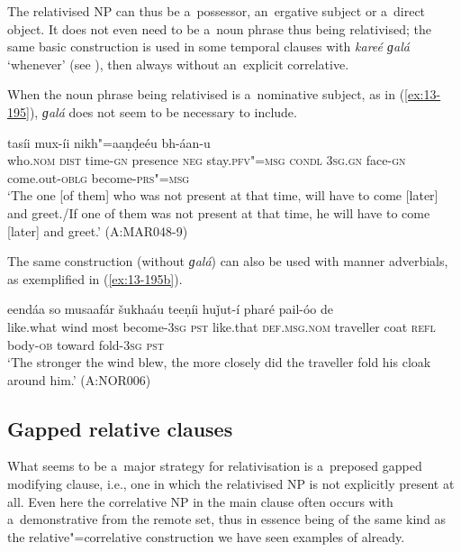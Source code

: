 

The relativised NP can thus be a~possessor, an~ergative subject or a~direct object. It does not even need to be a~noun phrase thus being relativised; the same basic construction is used in some temporal clauses with \textit{kareé ɡalá} `whenever' (see ), then always without an~explicit correlative.


When the noun phrase being relativised is a~nominative subject, as in (\ref{ex:13-195}), \textit{ɡalá} does not seem to be necessary to include. 

\begin{exe}
\ex
\label{ex:13-195}
 tasíi mux-íi nikh"=aaṇḍeéu bh-áan-u \\
who.\textsc{nom} \textsc{dist} time-\textsc{gn} presence \textsc{neg} stay.\textsc{pfv"=msg}  \textsc{condl } \textsc{3sg.gn} face-\textsc{gn} come.out-\textsc{oblg} become-\textsc{prs"=msg} \\
\glt `The one [of them] who was not present at that time, will have to come [later] and greet./If one of them was not present at that time, he will have to come [later] and greet.' (A:MAR048-9)
\end{exe}

The same construction (without \textit{ɡalá}) can also be used with manner adverbials, as exemplified in (\ref{ex:13-195b}).

\begin{exe}
\ex
\label{ex:13-195b}
 eendáa so musaafár šukhaáu teeṇíi huǰut-í pharé pail-óo de\\
like.what wind most become-\textsc{3sg} \textsc{pst} like.that \textsc{def.msg.nom} traveller coat \textsc{refl} body-\textsc{ob} toward fold-\textsc{3sg} \textsc{pst} \\
\glt `The stronger the wind blew, the more closely did the traveller fold his cloak around him.' (A:NOR006)
\end{exe}


\subsection{Gapped relative clauses}
\label{subsec:13-6-3}


What seems to be a~major strategy for relativisation is a~preposed gapped modifying clause, i.e., one in which the relativised NP is not explicitly present at all. Even here the correlative NP in the main clause often occurs with a~demonstrative from the remote set, thus in essence being of the same kind as the relative"=correlative construction we have seen examples of already.


